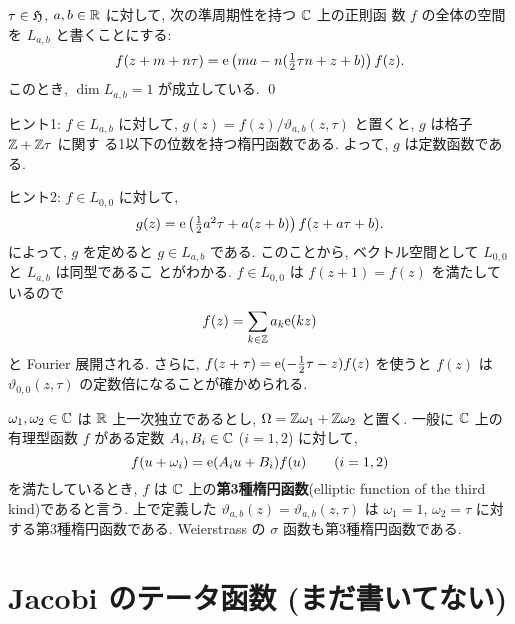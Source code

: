 \documentclass[12pt,twoside]{jarticle}
\def\e{{\text{\rm e}}}
\def\vt{\vartheta}
\def\H{{\frak H}}
\def\Z{{\Bbb Z}} %
\def\R{{\Bbb R}} %
\def\C{{\Bbb C}} %
\begin{document}
\begin{question}
  $\tau\in\H$, $a,b\in\R$ に対して, 次の準周期性を持つ $\C$ 上の正則函
  数 $f$ の全体の空間を $L_{a,b}$ と書くことにする:
  \[
  \textstyle
    f(z+m+n\tau)
    = \e\left(m a - n (\frac{1}{2}\tau n + z + b)\right) f(z).
  \] %
  このとき, $\dim L_{a,b}=1$ が成立している. \qed
\end{question}

\noindent ヒント1: $f\in L_{a,b}$ に対して, %
$g(z)=f(z)/\vt_{a,b}(z,\tau)$ と置くと, $g$ は格子 $\Z+\Z\tau$ に関す
る1以下の位数を持つ楕円函数である. よって, $g$ は定数函数である.

\medskip

\noindent ヒント2: $f\in L_{0,0}$ に対して,
\[
\textstyle
  g(z) = 
  \e\left(\frac{1}{2}a^2\tau + a(z+b)\right)
  f(z+a\tau+b).
\] %
によって, $g$ を定めると $g\in L_{a,b}$ である. %
このことから, ベクトル空間として $L_{0,0}$ と $L_{a,b}$ は同型であるこ
とがわかる. $f\in L_{0,0}$ は $f(z+1)=f(z)$ を満たしているので %
\[
  f(z) = \sum_{k\in\Z} a_k \e(kz)
\]
と Fourier 展開される. %
さらに, $f(z+\tau)=\e(-\frac{1}{2}\tau-z)f(z)$ を使うと $f(z)$ は %
$\vt_{0,0}(z,\tau)$ の定数倍になることが確かめられる.

\medskip

$\omega_1,\omega_2\in\C$ は $\R$ 上一次独立であるとし, %
$\Omega=\Z\omega_1+\Z\omega_2$ と置く. 一般に $\C$ 上の有理型函数 $f$ 
がある定数 $A_i,B_i\in\C$ ($i=1,2$) に対して, 
\[
  f(u+\omega_i) = \e(A_i u + B_i) f(u)
  \qquad
  (i=1,2)
\] %
を満たしているとき, $f$ は $\C$ 上の{\bf 第3種楕円函数}(elliptic
function of the third kind)であると言う. %
上で定義した $\vt_{a,b}(z)=\vt_{a,b}(z,\tau)$ は %
$\omega_1=1$, $\omega_2=\tau$ に対する第3種楕円函数である. Weierstrass
の $\sigma$ 函数も第3種楕円函数である.


\section{Jacobi のテータ函数 (まだ書いてない)}

\end{document}
